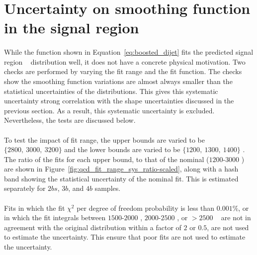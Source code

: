 \section{Uncertainty on smoothing function in the signal region}
\label{unc-smooth-qcd-in-sr}

\paragraph{} 
While the function shown in Equation~\ref{eq:boosted_dijet} fits the predicted signal region \mtwoJ~ distribution well, it does not have a concrete physical motivation.
Two checks are performed by varying the fit range and the fit function.
The checks show the smoothing function variations are almost always smaller than the statistical uncertainties of the distributions.
This gives this systematic uncertainty strong correlation with the shape uncertainties discussed in the previous section.
As a result, this systematic uncertainty is excluded.
Nevertheless, the tests are discussed below.

\paragraph{}
To test the impact of fit range, the upper bounds are varied to be $\{2800,\ 3000,\ 3200\}$ \GeV and the lower bounds are varied to be $\{1200,\ 1300,\ 1400\}$ \GeV.  
The ratio of the fits for each upper bound, to that of the nominal ($1200$-$3000$ \GeV) are shown in Figure~\ref{fig:qcd_fit_range_sys_ratio-scaled}, along with a hash band showing the statistical uncertainty of the nominal fit.
This is estimated separately for $2bs$, $3b$, and $4b$ samples.

\paragraph{}
Fits in which the fit $\chi^2$ per degree of freedom probability is less than $0.001\%$, or in which the fit integrals between $1500$-$2000$ \GeV, $2000$-$2500$ \GeV, or $>2500$ \GeV~ are not in agreement with the original distribution within a factor of $2$ or $0.5$, are not used to estimate the uncertainty. This ensure that poor fits are not used to estimate the uncertainty.

